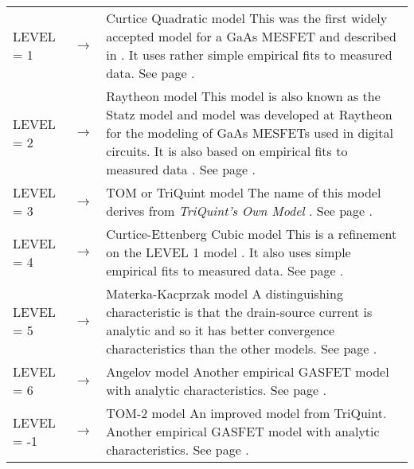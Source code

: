 \noindent\begin{longtable}{p{0.9in}p{0.2in}p{4in}}
         LEVEL = 1& $\rightarrow$ &  Curtice Quadratic model\newline
         This was the first widely accepted model for a GaAs MESFET
         and described in \cite{curtice:80}.  It
         uses rather simple empirical fits to measured data.
         See page \pageref{b:level1234:start}.
         \hspace*{\fill}\versions{\pspice}\\[0.1in]
         LEVEL = 2& $\rightarrow$ &  Raytheon model\newline
         This model is also known as the Statz model and
         model was developed at Raytheon for the modeling of GaAs
         MESFETs used in digital circuits.  It is also based on empirical
         fits to measured data \cite{statz:87}.
         See page \pageref{b:level1234:start}.
         \hspace*{\fill}\versions{\pspice}
\\[0.1in]
         LEVEL = 3& $\rightarrow$ &  TOM or TriQuint model\newline
         The name of this model derives from {\it TriQuint's Own Model}
     \cite{mccamant:mccormack:90}.
         See page \pageref{b:level1234:start}.
         \hspace*{\fill}\versions{\pspice}
\\[0.1in]
         LEVEL = 4& $\rightarrow$ &  Curtice-Ettenberg Cubic model\newline
         This is a refinement on the LEVEL 1 model
         \cite{curtice:ettenberg:85}.  It also
         uses simple empirical fits to measured data.
         See page \pageref{b:level1234:start}.
         \hspace*{\fill}
\\[0.1in]
         LEVEL = 5& $\rightarrow$ &  Materka-Kacprzak model
         \cite{kacprzak:materka:83}\newline
         A distinguishing characteristic is that the drain-source current
         is analytic and so it has better convergence characteristics than
         the other models.
         See page \pageref{b:level5:start}.
         \hspace*{\fill}
\\[0.1in]
         LEVEL = 6& $\rightarrow$ &  Angelov model\newline
         Another empirical GASFET model with analytic characteristics.
         See page \pageref{b:level6:start}.
         \hspace*{\fill}
\\[0.1in]
         LEVEL = -1& $\rightarrow$ &  TOM-2 model\newline
         An improved model from TriQuint.
         Another empirical GASFET model with analytic characteristics.
         See page \pageref{b:level-1:start}.
         \hspace*{\fill}
\end{longtable}

